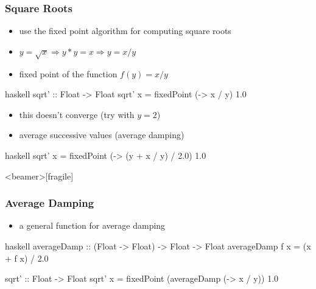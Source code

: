 \documentclass[dvipsnames]{beamer}
\theoremstyle{plain}
\begin{document}
\begin{frame}[fragile]
  \frametitle{Square Roots}

  \begin{itemize}
    \item use the fixed point algorithm for computing square roots
    \item $y = \sqrt{x} \Rightarrow y * y = x \Rightarrow y = x / y$
    \item fixed point of the function $f(y) = x / y$
  \end{itemize}

  \pause
  \begin{exampleblock}{}
    \begin{pygments}{haskell}
sqrt' :: Float -> Float
sqrt' x = fixedPoint (\y -> x / y) 1.0
    \end{pygments}
  \end{exampleblock}

  \pause
  \begin{itemize}
    \item this doesn't converge (try with $y = 2$)
    \item average successive values (average damping)
  \end{itemize}

  \begin{exampleblock}{}
    \begin{pygments}{haskell}
sqrt' x = fixedPoint (\y -> (y + x / y) / 2.0) 1.0
    \end{pygments}
  \end{exampleblock}
\end{frame}

\begin{frame}<beamer>[fragile]
  \frametitle{Average Damping}

  \begin{itemize}
    \item a general function for average damping
  \end{itemize}

  \begin{exampleblock}{}
    \begin{pygments}{haskell}
averageDamp :: (Float -> Float) -> Float -> Float
averageDamp f x = (x + f x) / 2.0

sqrt' :: Float -> Float
sqrt' x = fixedPoint (averageDamp (\y -> x / y)) 1.0
    \end{pygments}
  \end{exampleblock}
\end{frame}
\end{document}
